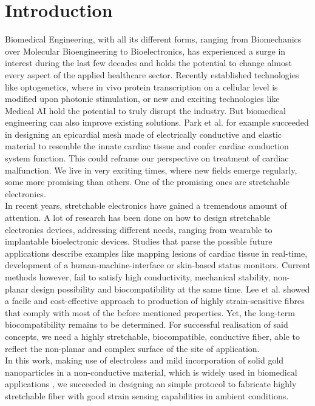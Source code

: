 \section{Introduction}
Biomedical Engineering, with all its different forms, ranging from Biomechanics over Molecular Bioengineering to Bioelectronics, has experienced a surge in interest during the last few decades and holds the potential to change almost every aspect of the applied healthcare sector.\cite{BiomedicalIndustry} Recently established technologies like optogenetics,\cite{Optogenetics} where in vivo protein transcription on a cellular level is modified upon photonic stimulation, or new and exciting technologies like Medical AI\cite{MedicalAI} hold the potential to truly disrupt the industry. But biomedical engineering can also improve existing solutions. Park et al.\cite{EpicardialMesh} for example succeeded in designing an epicardial mesh made of electrically conductive and elastic material to resemble the innate cardiac tissue and confer cardiac conduction system function. This could reframe our perspective on treatment of cardiac malfunction. We live in very exciting times, where new fields emerge regularly, some more promising than others. One of the promising ones are stretchable electronics.\\
In recent years, stretchable electronics have gained a tremendous amount of attention. \cite{Cherenack, Lee} A lot of research has been done on how to design stretchable electronics devices, addressing different needs, ranging from wearable to implantable bioelectronic devices. Studies that parse the possible future applications describe examples like mapping lesions of cardiac tissue in real-time\cite{DiBiase}, development of a human-machine-interface\cite{Hochberg} or skin-based status monitors\cite{Kim}. Current methods however, fail to satisfy high conductivity, mechanical stability, non-planar design possibility and biocompatibility at the same time. Lee et al.  showed a facile and cost-effective approach to production of highly strain-sensitive fibres that comply with most of the before mentioned properties.\cite{Lee} Yet, the long-term biocompatibility remains to be determined. For successful realisation of said concepts, we need a highly stretchable, biocompatible, conductive fiber, able to reflect the non-planar and complex surface of the site of application.\\
In this work, making use of electroless and mild incorporation of solid gold nanoparticles in a non-conductive material, which is widely used in biomedical applications \cite{Pinchuk}, we succeeded in designing an simple protocol to fabricate  highly stretchable fiber with good strain sensing capabilities in ambient conditions.\\